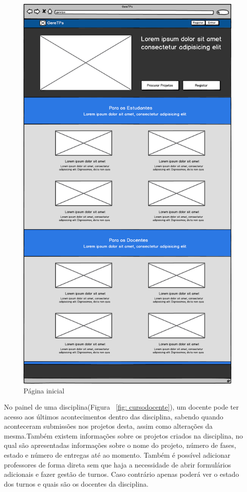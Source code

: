 \begin{figure}[H]
        \centering
        \includegraphics[width=1\textwidth]{images/prototipos/mockups/home.png}
         \caption{Página inicial}
         \label{fig: home}
\end{figure}

No painel de uma disciplina(Figura ~\ref{fig: cursodocente}), um docente pode ter acesso aos últimos acontecimentos dentro das disciplina, sabendo quando aconteceram submissões nos projetos desta, assim como alterações da mesma.Também existem informações sobre os projetos criados na disciplina, no qual são apresentadas informações sobre o nome do projeto, número de fases, estado e número de entregas até ao momento. Também é possível adicionar professores de forma direta sem que haja a necessidade de abrir formulários adicionais e fazer gestão de turnos. Caso contrário apenas poderá ver o estado dos turnos e quais são os docentes da disciplina.\\

